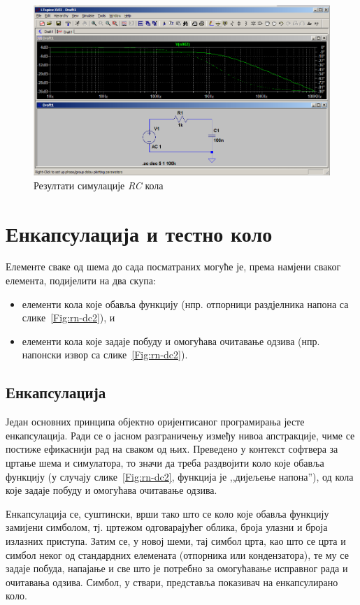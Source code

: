 \begin{figure}[h]
\centering
\includegraphics[width=\figwidth\textwidth]{figs/rc-ac2.PNG}
\caption{Резултати симулације \textit{RC} кола}
\label{Fig:rc-ac2}
\end{figure}

\chapter{Енкапсулација и тестно коло}

Елементе сваке од шема до сада посматраних могуће је, према намјени сваког елемента, подијелити на два скупа:
\begin{itemize}
\item елементи кола које обавља функцију (нпр. отпорници раздјелника напона са слике~\ref{Fig:rn-dc2}), и
\item елементи кола које задаје побуду и омогућава очитавање одзива (нпр. напонски извор са слике~\ref{Fig:rn-dc2}).
\end{itemize}

\section{Енкапсулација}

Један основних принципа објектно оријентисаног програмирања јесте енкапсулација. Ради се о јасном разграничењу између нивоа апстракције, чиме се постиже ефикаснији рад на сваком од њих. Преведено у контекст софтвера за цртање шема и симулатора, то значи да треба раздвојити коло које обавља функцију (у случају слике~\ref{Fig:rn-dc2}, функција је ,,дијељење напона''), од кола које задаје побуду и омогућава очитавање одзива.

Енкапсулација се, суштински, врши тако што се коло које обавља функцију замијени симболом, тј. цртежом одговарајућег облика, броја улазни и броја излазних приступа. Затим се, у новој шеми, тај симбол црта, као што се црта и симбол неког од стандардних елемената (отпорника или кондензатора), те му се задаје побуда, напајање и све што је потребно за омогућавање исправног рада и очитавања одзива. Симбол, у ствари, представља показивач на енкапсулирано коло.

